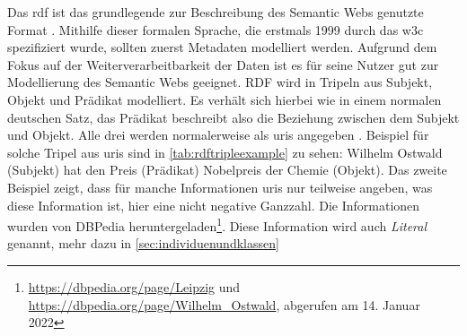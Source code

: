 Das \ac{rdf} ist das grundlegende zur Beschreibung des Semantic Webs genutzte Format \citep[S.~35]{semanticwebgrundlagen}.
Mithilfe dieser formalen Sprache, die erstmals 1999 durch das \ac{w3c} spezifiziert wurde, sollten zuerst Metadaten modelliert werden.
Aufgrund dem Fokus auf der Weiterverarbeitbarkeit der Daten ist es für seine Nutzer gut zur Modellierung des Semantic Webs geeignet.
RDF wird in Tripeln aus Subjekt, Objekt und Prädikat modelliert.
Es verhält sich hierbei wie in einem normalen deutschen Satz, das Prädikat beschreibt also die Beziehung zwischen dem Subjekt und Objekt.
Alle drei werden normalerweise als \acp{uri} angegeben \citep{linkeddatadesignissues}.
Beispiel für solche Tripel aus \acp{uri} sind in \cref{tab:rdftripleexample} zu sehen:
Wilhelm Ostwald (Subjekt) hat den Preis (Prädikat) Nobelpreis der Chemie (Objekt).
Das zweite Beispiel zeigt, dass für manche Informationen \acp{uri} nur teilweise angeben, was diese Information ist, hier eine nicht negative Ganzzahl.
Die Informationen wurden von DBPedia heruntergeladen\footnote{\url{https://dbpedia.org/page/Leipzig} und \url{https://dbpedia.org/page/Wilhelm_Ostwald}, abgerufen am 14. Januar 2022}.
Diese Information wird auch \emph{Literal} genannt, mehr dazu in \cref{sec:individuenundklassen}
